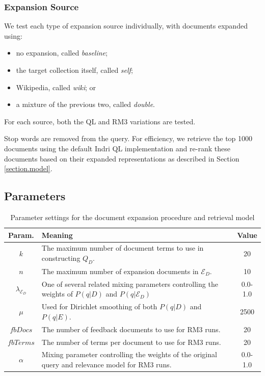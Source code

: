 \documentclass{sig-alternate}
\begin{document}
\subsubsection{Expansion Source}\label{section.evaluation.runs.expansion}

We test each type of expansion source individually, with documents expanded using:
\begin{itemize}
	\item no expansion, called \textit{baseline};
	\item the target collection itself, called \textit{self};
	\item Wikipedia, called \textit{wiki}; or
	\item a mixture of the previous two, called \textit{double}.
\end{itemize}

\noindent For each source, both the QL and RM3 variations are tested.

Stop words are removed from the query. For efficiency, we retrieve the top 1000 documents using the default Indri QL implementation and re-rank these documents based on their expanded representations as described in Section \ref{section.model}.

\subsection{Parameters}\label{section.evaluation.parameters}

\begin{table}[htb]
\centering
\begin{tabular}{|c|p{}|c|} \hline
{\bf Param.} & {\bf Meaning} & {\bf Value} \\ \hline
$k$ & The maximum number of document terms to use in constructing $Q_D$. & 20 \\ \hline
$n$ & The maximum number of expansion documents in $\mathcal{E}_D$. & 10 \\ \hline
$\lambda_{\mathcal{E}_D}$ & One of several related mixing parameters controlling the weights of $P(q|D)$ and $P(q|\mathcal{E}_D)$ & 0.0-1.0 \\ \hline
$\mu$ & Used for Dirichlet smoothing of both $P(q|D)$ and $P(q|E)$. & 2500 \\ \hline
$fbDocs$ & The number of feedback documents to use for RM3 runs. & 20 \\ \hline
$fbTerms$ & The number of terms per document to use for RM3 runs. & 20 \\ \hline
$\alpha$ & Mixing parameter controlling the weights of the original query and relevance model for RM3 runs. & 0.0-1.0 \\ \hline
\end{tabular}
\caption{Parameter settings for the document expansion procedure and retrieval model}
\label{table.parameters}
\end{table}
\end{document}
